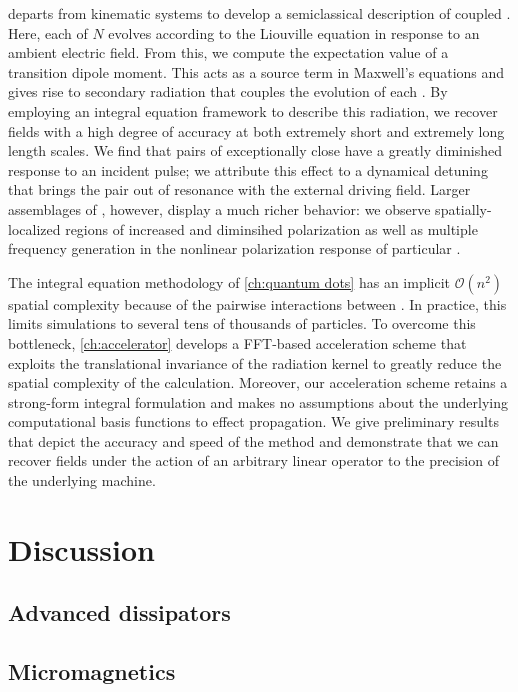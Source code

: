  departs from kinematic systems to develop a semiclassical description of coupled \qds{}.
Here, each of $N$ \qds{} evolves according to the Liouville equation in response to an ambient electric field.
From this, we compute the expectation value of a transition dipole moment.
This acts as a source term in Maxwell's equations and gives rise to secondary radiation that couples the evolution of each \qd{}.
By employing an integral equation framework to describe this radiation, we recover fields with a high degree of accuracy at both extremely short and extremely long length scales.
We find that pairs of exceptionally close \qds{} have a greatly diminished response to an incident pulse; we attribute this effect to a dynamical detuning that brings the pair out of resonance with the external driving field. 
Larger assemblages of \qds{}, however, display a much richer behavior: we observe spatially-localized regions of increased and diminsihed polarization as well as multiple frequency generation in the nonlinear polarization response of particular \qds{}.

The integral equation methodology of \cref{ch:quantum dots} has an implicit $\mathcal{O}(n^2)$ spatial complexity because of the pairwise interactions between \qds{}.
In practice, this limits simulations to several tens of thousands of particles.
To overcome this bottleneck, \cref{ch:accelerator} develops a FFT-based acceleration scheme that exploits the translational invariance of the radiation kernel to greatly reduce the spatial complexity of the calculation.
Moreover, our acceleration scheme retains a strong-form integral formulation and makes no assumptions about the underlying computational basis functions to effect propagation.
We give preliminary results that depict the accuracy and speed of the method and demonstrate that we can recover fields under the action of an arbitrary linear operator to the precision of the underlying machine.

\section{Discussion}

\subsection{Advanced dissipators}

\subsection{Micromagnetics}

